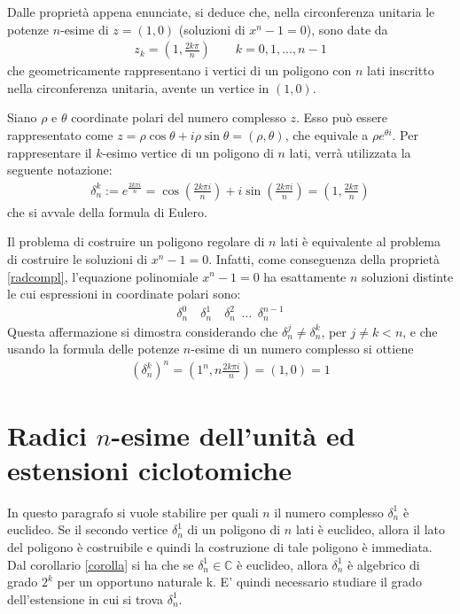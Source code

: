 Dalle proprietà appena enunciate, si deduce che, nella circonferenza unitaria le potenze $n$-esime di $z = (1, 0)$ (soluzioni di $x^n - 1 = 0$), sono date da 
\begin{align*} 
z_k = (1 , \frac{2k\pi}{n}) \qquad k = 0, 1, ... , n-1
\end{align*}
che geometricamente rappresentano i vertici di un poligono con $n$ lati inscritto nella circonferenza unitaria, avente un vertice in $(1,0)$.

Siano $\rho$ e $\theta$ coordinate polari del numero complesso $z$. Esso può essere rappresentato come $z = \rho \cos \theta + i \rho \sin \theta = (\rho, \theta)$, che equivale a $\rho e^{\theta i}$. Per rappresentare il $k$-esimo vertice di un poligono di $n$ lati, verrà utilizzata la seguente notazione:
\begin{align*} 
\delta_{n}^{k} := e^{\frac{2k\pi i}{n}} = \cos(\frac{2k\pi i}{n}) + i \sin(\frac{2k\pi i}{n}) =  (1 , \frac{2k\pi}{n})
\end{align*}
\noindent
che si avvale della formula di Eulero.

\begin{osservazione}
Il problema di costruire un poligono regolare di $n$ lati è equivalente al problema di costruire le soluzioni di $x^n - 1 = 0$. Infatti, come conseguenza della proprietà \ref{radcompl}, l'equazione polinomiale $x^n -1 = 0$ ha esattamente $n$ soluzioni distinte le cui espressioni in coordinate polari sono:
\begin{align*} 
\delta_{n}^{0} \quad \delta_{n}^{1} \quad \delta_{n}^{2} \phantom{z} \dots \phantom{z} \delta_{n}^{n-1} 
\end{align*}
Questa affermazione si dimostra considerando che $\delta_{n}^{j} \neq \delta_{n}^{k}$, per $j \neq k < n$, e che usando la formula delle potenze $n$-esime di un numero complesso si ottiene 
\begin{align*}
(\delta_{n}^{k})^n = (1^n, n\frac{2k\pi i}{n}) = (1,0) = 1 
\end{align*}
\end{osservazione}


\section{Radici $n$-esime dell'unità ed estensioni ciclotomiche}
In questo paragrafo si vuole stabilire per quali $n$ il numero complesso $\delta_{n}^{1}$ è euclideo.
Se il secondo vertice $\delta_{n}^{1}$ di un poligono di $n$ lati è euclideo, allora il lato del poligono è costruibile e quindi la costruzione di tale poligono è immediata.
Dal corollario \ref{corolla} si ha che se $\delta_{n}^{1} \in \mathbb{C}$ è euclideo, allora $\delta_{n}^{1}$ è algebrico di grado $2^k$ per un opportuno naturale k. E' quindi necessario studiare il grado dell'estensione in cui si trova $\delta_{n}^{1}$.

